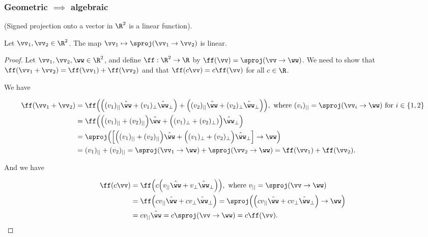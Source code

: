 \subsubsection*{Geometric $\implies$ algebraic}

\begin{lemma}
    (Signed projection onto a vector in $\R^2$ is a linear function).
    
    Let $\vv_1, \vv_2 \in \R^2$. The map $\vv_1 \mapsto \sproj(\vv_1 \rightarrow \vv_2)$ is linear.
\end{lemma}

\begin{proof}
    Let $\vv_1, \vv_2, \ww \in \R^2$, and define $\ff:\R^2 \rightarrow \R$ by $\ff(\vv) = \sproj(\vv \rightarrow \ww)$. We need to show that $\ff(\vv_1 + \vv_2) = \ff(\vv_1) + \ff(\vv_2)$ and that $\ff(c\vv) = c\ff(\vv)$ for all $c \in \R$. 
    
    We have
    
    \begin{align*}
        \ff(\vv_1 + \vv_2) &= \ff\Big(\Big((v_1)_{||}\hat{\ww} + (v_1)_{\perp}\hat{\ww}_\perp \Big) + \Big((v_2)_{||}\hat{\ww} + (v_2)_\perp \hat{\ww}_\perp \Big) \Big), \text{ where $(v_i)_{||} = \sproj(\vv_i \rightarrow \ww)$ for $i \in \{1, 2\}$} \\
        &= \ff \Big(\Big((v_1)_{||} + (v_2)_{||} \Big) \hat{\ww} + \Big((v_1)_\perp + (v_2)_\perp) \Big) \hat{\ww}_\perp \Big) \\
        &= \sproj\Big(\Big[ \Big((v_1)_{||} + (v_2)_{||} \Big) \hat{\ww} + \Big((v_1)_\perp + (v_2)_\perp \Big) \hat{\ww}_\perp \Big] \rightarrow \ww \Big) \\
        &= (v_1)_{||} + (v_2)_{||} 
        = \sproj(\vv_1 \rightarrow \ww) + \sproj(\vv_2 \rightarrow \ww) = \ff(\vv_1) + \ff(\vv_2).
    \end{align*}

    And we have
    
    \begin{align*}
        \ff(c \vv) &= 
        \ff \Big(c \Big(v_{||}\hat{\ww} + v_{\perp}\hat{\ww}_\perp \Big) \Big), \text{ where $v_{||} = \sproj(\vv \rightarrow \ww)$} \\
        &= \ff\Big(cv_{||}\hat{\ww} + cv_{\perp}\hat{\ww}_\perp \Big)
        = \sproj\Big(\Big(cv_{||}\hat{\ww} + cv_{\perp}\hat{\ww}_\perp \Big) \rightarrow \ww \Big) \\
        &= c v_{||} \hat{\ww} = c \sproj(\vv \rightarrow \ww) = c \ff(\vv).
    \end{align*}
\end{proof}

